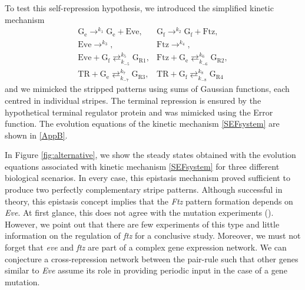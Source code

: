 \documentclass[final,authoryear, 5p, times]{elsarticle}
\begin{document}
To test this self-repression hypothesis, we introduced the simplified kinetic mechanism
\begin{equation} \label{SEFsystem}
        \begin{array}{ll}\displaystyle 
        \text{G}_\text{e}  \mathop{\longrightarrow}^{k_{1}} \text{G}_\text{e} + \text{Eve}, & \displaystyle
        \text{G}_\text{f}  \mathop{\longrightarrow}^{k_{2}} \text{G}_\text{f} + \text{Ftz}, \\ \displaystyle
        \text{Eve} \mathop{\longrightarrow}^{k_{3}}, & \displaystyle
        \text{Ftz} \mathop{\longrightarrow}^{k_{4}}, \\ \displaystyle
        \text{Eve} + \text{G}_\text{f} \mathop{\rightleftarrows}^{k_{5}}_{k_{-5}} \text{G}_{\text{R1}}, & \displaystyle
        \text{Ftz} + \text{G}_\text{e} \mathop{\rightleftarrows}^{k_{6}}_{k_{-6}} \text{G}_{\text{R2}}, \\ \displaystyle
        \text{TR} + \text{G}_\text{e} \mathop{\rightleftarrows}^{k_{7}}_{k_{-7}} \text{G}_{\text{R3}}, & \displaystyle
        \text{TR} + \text{G}_\text{f} \mathop{\rightleftarrows}^{k_{8}}_{k_{-8}} \text{G}_{\text{R4}}
    \end{array}
\end{equation} 
and we mimicked the stripped patterns using sums of Gaussian functions, each centred in individual stripes. The terminal repression is ensured by the hypothetical terminal regulator protein  and was mimicked using the Error function. The evolution equations of the kinetic mechanism \eqref{SEFsystem} are shown in \ref{AppB}. 

In  Figure \ref{fig:alternative}, we show the steady states obtained with the evolution equations associated with kinetic mechanism \eqref{SEFsystem} for three different biological scenarios.  In every case, this epistasis mechanism proved sufficient to produce two perfectly complementary stripe patterns.
Although successful in theory, this epistasis concept implies that the \textit{Ftz} pattern formation depends on \textit{Eve}. At first glance, this does not agree with the mutation experiments (\cite{Harding}). However, we point out that there are few experiments of this type and little information on the regulation of \textit{ftz} for a conclusive study. Moreover, we must not forget that \textit{eve} and \textit{ftz} are part of a complex gene expression network. We can conjecture a cross-repression network between the pair-rule such that other genes similar to \textit{Eve} assume its role in providing periodic input in the case of a gene mutation. 
\end{document}
